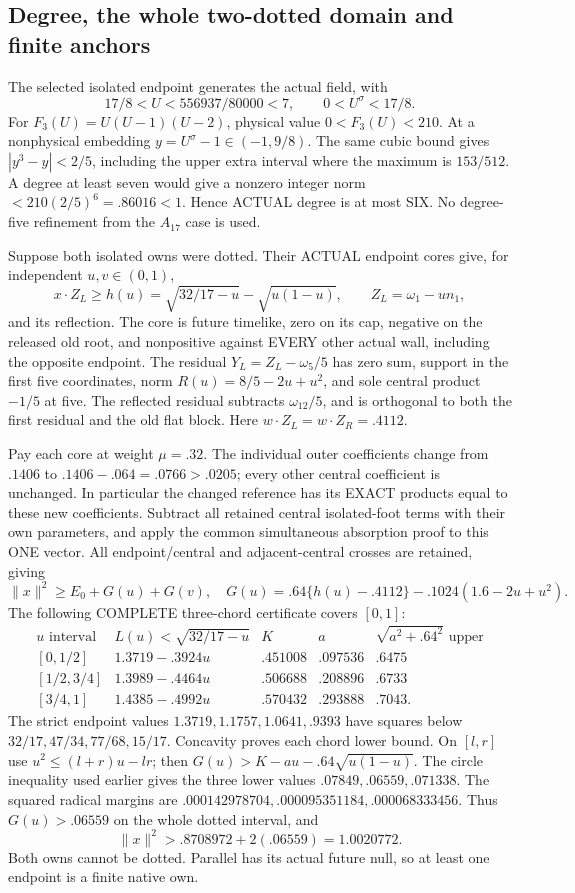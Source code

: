 \documentclass[11pt]{article}
\begin{document}
\subsection{Degree, the whole two-dotted domain and finite anchors}
\label{app:arithA16anchors}

The selected isolated endpoint generates the actual field, with
\[
 17/8<U<556937/80000<7,\qquad0<U^\sigma<17/8 .
\]
For \(F_3(U)=U(U-1)(U-2)\), physical value \(0<F_3(U)<210\).
At a nonphysical embedding \(y=U^\sigma-1\in(-1,9/8)\).
The same cubic bound gives
\(|y^3-y|<2/5\), including the upper extra interval where
the maximum is \(153/512\).
A degree at least seven would give a nonzero integer norm
\(<210(2/5)^6=.86016<1\).
Hence ACTUAL degree is at most SIX.
No degree-five refinement from the \(A_{17}\) case is used.

Suppose both isolated owns were dotted.
Their ACTUAL endpoint cores give, for independent \(u,v\in(0,1)\),
\[
 x\cdot Z_L\ge h(u)=\sqrt{32/17-u}-\sqrt{u(1-u)},\qquad
 Z_L=\omega_1-un_1 ,
\]
and its reflection.
The core is future timelike, zero on its cap, negative on the
released old root, and nonpositive against EVERY other actual
wall, including the opposite endpoint.
The residual \(Y_L=Z_L-\omega_5/5\) has zero sum,
support in the first five coordinates, norm
\(R(u)=8/5-2u+u^2\), and sole central product \(-1/5\)
at five.
The reflected residual subtracts \(\omega_{12}/5\), and is
orthogonal to both the first residual and the old flat block.
Here \(w\cdot Z_L=w\cdot Z_R=.4112\).

Pay each core at weight \(\mu=.32\).
The individual outer coefficients change from \(.1406\) to
\(.1406-.064=.0766>.0205\);
every other central coefficient is unchanged.
In particular the changed reference has its EXACT products
equal to these new coefficients.
Subtract all retained central isolated-foot terms with their
own parameters, and apply the common simultaneous absorption
proof to this ONE vector.
All endpoint/central and adjacent-central crosses are retained,
giving
\[
 \|x\|^2\ge E_0+G(u)+G(v),\quad
 G(u)=.64\{h(u)-.4112\}-.1024(1.6-2u+u^2).
\]
The following COMPLETE three-chord certificate covers \([0,1]\):
\[
\begin{array}{c|c|c|c|c}
u\text{ interval}&L(u)<\sqrt{32/17-u}&K&a&
 \sqrt{a^2+.64^2}\text{ upper}\\ \hline
{}[0,1/2]&1.3719-.3924u&.451008&.097536&.6475\\
{}[1/2,3/4]&1.3989-.4464u&.506688&.208896&.6733\\
{}[3/4,1]&1.4385-.4992u&.570432&.293888&.7043 .
\end{array}
\]
The strict endpoint values \(1.3719,1.1757,1.0641,.9393\)
have squares below \(32/17,47/34,77/68,15/17\).
Concavity proves each chord lower bound.
On \([l,r]\) use \(u^2\le(l+r)u-lr\);
then \(G(u)>K-au-.64\sqrt{u(1-u)}\).
The circle inequality used earlier gives the three lower values
\(.07849,.06559,.071338\).
The squared radical margins are
\(.000142978704,.000095351184,.000068333456\).
Thus \(G(u)>.06559\) on the whole dotted interval, and
\[
                  \|x\|^2>.8708972+2(.06559)=1.0020772 .
\]
Both owns cannot be dotted.
Parallel has its actual future null, so at least one endpoint
is a finite native own.
\end{document}

